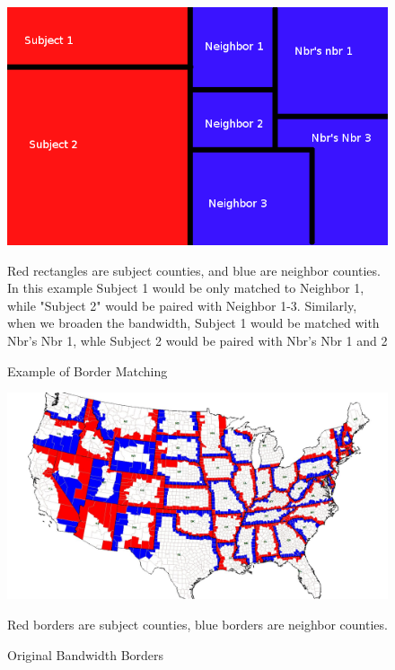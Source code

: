 \documentclass[12pt,a4paper]{article}
\begin{document}
\begin{figure}[h]\label{rb}
    \centering
    \caption{Example of Border Matching}
    \begin{minipage}{0.70\textwidth}
    \includegraphics[scale = 0.5]{../analysis/output/borders_temp.png}
    {\footnotesize Red rectangles are subject counties, and blue are neighbor counties. In this example Subject 1 would be only matched to Neighbor 1, while "Subject 2" would be paired with Neighbor 1-3. Similarly, when we broaden the bandwidth, Subject 1 would be matched with Nbr's Nbr 1, whle Subject 2 would be paired with Nbr's Nbr 1 and 2 \par}
    \end{minipage}
\end{figure}

\begin{figure}[h]\label{eb}
    \centering
    \caption{Original Bandwidth Borders}\par\medskip
        \begin{minipage}{0.70\textwidth}
    \includegraphics[scale = 0.20]{../analysis/output/rb_picture.png}
    {\footnotesize Red borders are subject counties, blue borders are neighbor counties.\par}
    \end{minipage}
\end{figure}
\end{document}
